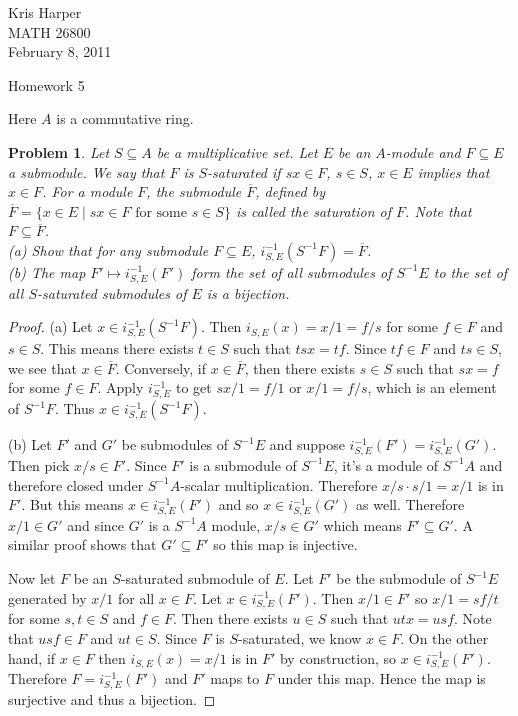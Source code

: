 \documentclass{article}
\newtheorem{problem}{Problem}
\begin{document}
\begin{flushright}
Kris Harper\\

MATH 26800\\

February 8, 2011
\end{flushright}

\begin{center}
Homework 5
\end{center}

\noindent
Here $A$ is a commutative ring.

\begin{problem}
Let $S \subseteq A$ be a multiplicative set. Let $E$ be an $A$-module and $F \subseteq E$ a submodule. We say that $F$ is $S$-saturated if $sx \in F$, $s \in S$, $x \in E$ implies that $x \in F$. For a module $F$, the submodule $\overline{F}$, defined by $\overline{F} = \{x \in E \mid sx \in F \text{ for some } s \in S\}$ is called the saturation of $F$. Note that $F \subseteq \overline{F}$.\\
(a) Show that for any submodule $F \subseteq E$, $i_{S,E}^{-1}(S^{-1}F) = \overline{F}$.\\
(b) The map $F' \mapsto i_{S,E}^{-1}(F')$ form the set of all submodules of $S^{-1}E$ to the set of all $S$-saturated submodules of $E$ is a bijection.
\end{problem}
\begin{proof}
(a) Let $x \in i_{S,E}^{-1}(S^{-1}F)$. Then $i_{S,E}(x) = x/1 = f/s$ for some $f \in F$ and $s \in S$. This means there exists $t \in S$ such that $tsx = tf$. Since $tf \in F$ and $ts \in S$,  we see that $x \in \overline{F}$. Conversely, if $x \in \overline{F}$, then there exists $s \in S$ such that $sx = f$ for some $f \in F$. Apply $i_{S,E}^{-1}$ to get $sx/1 = f/1$ or $x/1 = f/s$, which is an element of $S^{-1}F$. Thus $x \in i_{S,E}^{-1}(S^{-1}F)$.

(b) Let $F'$ and $G'$ be submodules of $S^{-1}E$ and suppose $i_{S,E}^{-1}(F') = i_{S,E}^{-1}(G')$. Then pick $x/s \in F'$. Since $F'$ is a submodule of $S^{-1}E$, it's a module of $S^{-1}A$ and therefore closed under $S^{-1}A$-scalar multiplication. Therefore $x/s \cdot s/1 = x/1$ is in $F'$. But this means $x \in i_{S,E}^{-1}(F')$ and so $x \in i_{S,E}^{-1}(G')$ as well. Therefore $x/1 \in G'$ and since $G'$ is a $S^{-1}A$ module, $x/s \in G'$ which means $F' \subseteq G'$. A similar proof shows that $G' \subseteq F'$ so this map is injective.

Now let $F$ be an $S$-saturated submodule of $E$. Let $F'$ be the submodule of $S^{-1}E$ generated by $x/1$ for all $x \in F$. Let $x \in i_{S,E}^{-1}(F')$. Then $x/1 \in F'$ so $x/1 = sf/t$ for some $s,t \in S$ and $f \in F$. Then there exists $u \in S$ such that $utx = usf$. Note that $usf \in F$ and $ut \in S$. Since $F$ is $S$-saturated, we know $x \in F$. On the other hand, if $x \in F$ then $i_{S,E}(x) = x/1$ is in $F'$ by construction, so $x \in i_{S,E}^{-1}(F')$. Therefore $F = i_{S,E}^{-1}(F')$ and $F'$ maps to $F$ under this map. Hence the map is surjective and thus a bijection.
\end{proof}
\end{document}
